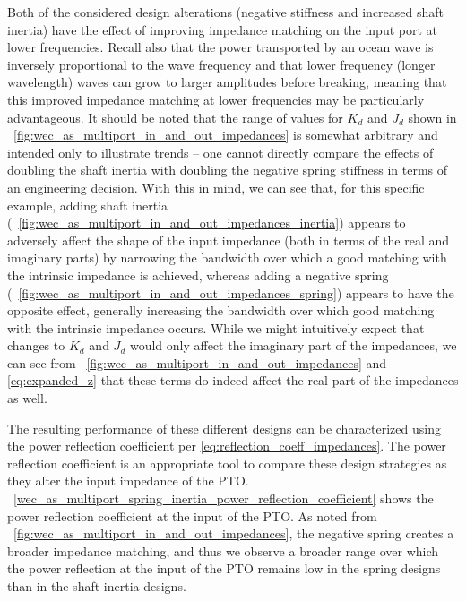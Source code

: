 \documentclass[twocolumn]{autart}
\begin{document}
Both of the considered design alterations (negative stiffness and increased shaft inertia) have the effect of improving impedance matching on the input port at lower frequencies.
Recall also that the power transported by an ocean wave is inversely proportional to the wave frequency and that lower frequency (longer wavelength) waves can grow to larger amplitudes before breaking, meaning that this improved impedance matching at lower frequencies may be particularly advantageous.
It should be noted that the range of values for $K_d$ and $J_d$ shown in \figurename~\ref{fig:wec_as_multiport_in_and_out_impedances} is somewhat arbitrary and intended only to illustrate trends -- one cannot directly compare the effects of doubling the shaft inertia with doubling the negative spring stiffness in terms of an engineering decision.
With this in mind, we can see that, for this specific example, adding shaft inertia (\figurename~\ref{fig:wec_as_multiport_in_and_out_impedances_inertia}) appears to adversely affect the shape of the input impedance (both in terms of the real and imaginary parts) by narrowing the bandwidth over which a good matching with the intrinsic impedance is achieved, whereas adding a negative spring (\figurename~\ref{fig:wec_as_multiport_in_and_out_impedances_spring}) appears to have the opposite effect, generally increasing the bandwidth over which good matching with the intrinsic impedance occurs.
While we might intuitively expect that changes to $K_d$ and $J_d$ would only affect the imaginary part of the impedances, we can see from \figurename~\ref{fig:wec_as_multiport_in_and_out_impedances} and \eqref{eq:expanded_z} that these terms do indeed affect the real part of the impedances as well.

The resulting performance of these different designs can be characterized using the power reflection coefficient per \eqref{eq:reflection_coeff_impedances}.
The power reflection coefficient is an appropriate tool to compare these design strategies as they alter the input impedance of the PTO.
\figurename~\ref{wec_as_multiport_spring_inertia_power_reflection_coefficient} shows the power reflection coefficient at the input of the PTO.
As noted from \figurename~\ref{fig:wec_as_multiport_in_and_out_impedances}, the negative spring creates a broader impedance matching, and thus we observe a broader range over which the power reflection at the input of the PTO  remains low in the spring designs than in the shaft inertia designs.
\end{document}

